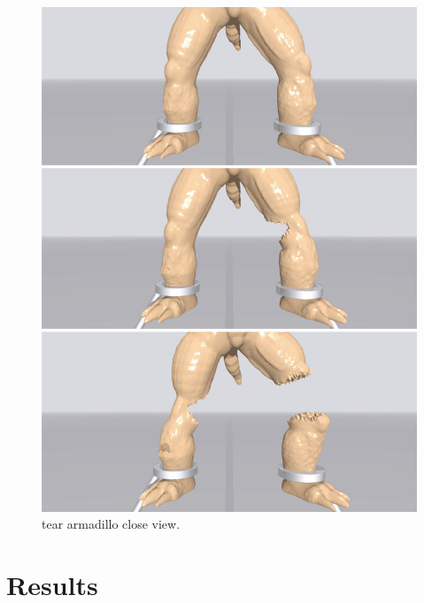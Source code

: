 \begin{figure}[h]
  \centering
  \includegraphics[width=\linewidth]{./figs/demo_tear_armadillo_close_view.eps}
  \caption{\label{fig:7}
  tear armadillo close view.
}
\end{figure}

\section{Results}

